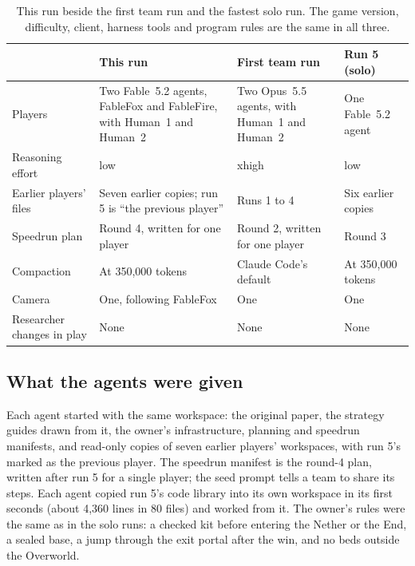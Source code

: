 \documentclass[11pt,a4paper]{article}
\begin{document}
\begin{table}[t]
  \caption{This run beside the first team run and the fastest solo run. The game version, difficulty, client, harness tools and program rules are the same in all three.}
  \label{tab:setup}
  \footnotesize
  \begin{tabularx}{\textwidth}{@{}>{\raggedright\arraybackslash}p{2.5cm}>{\raggedright\arraybackslash}X>{\raggedright\arraybackslash}X>{\raggedright\arraybackslash}X@{}}
    \toprule
    & \textbf{This run} & \textbf{First team run} & \textbf{Run 5 (solo)} \\
    \midrule
    Players & Two Fable~5.2 agents, FableFox and FableFire, with Human~1 and Human~2 & Two Opus~5.5 agents, with Human~1 and Human~2 & One Fable~5.2 agent \\
    Reasoning effort & low & xhigh & low \\
    Earlier players' files & Seven earlier copies; run 5 is ``the previous player'' & Runs 1 to 4 & Six earlier copies \\
    Speedrun plan & Round 4, written for one player & Round 2, written for one player & Round 3 \\
    Compaction & At 350,000 tokens & Claude Code's default & At 350,000 tokens \\
    Camera & One, following FableFox & One & One \\
    Researcher changes in play & None & None & None \\
    \bottomrule
  \end{tabularx}
\end{table}

\subsection{What the agents were given}

Each agent started with the same workspace: the original paper, the strategy guides drawn from it, the owner's infrastructure, planning and speedrun manifests, and read-only copies of seven earlier players' workspaces, with run 5's marked as the previous player. The speedrun manifest is the round-4 plan, written after run 5 for a single player; the seed prompt tells a team to share its steps. Each agent copied run 5's code library into its own workspace in its first seconds (about 4,360 lines in 80 files) and worked from it. The owner's rules were the same as in the solo runs: a checked kit before entering the Nether or the End, a sealed base, a jump through the exit portal after the win, and no beds outside the Overworld.
\end{document}
